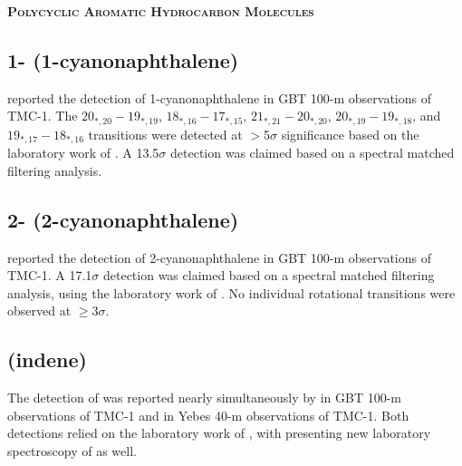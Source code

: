 \documentclass[twocolumn]{aastex631}
\newcommand{\update}[1]{{#1}}
\begin{document}
    
    \begin{center}
        \large
        \textsc{\textbf{\update{Polycyclic Aromatic Hydrocarbon Molecules}}}
        \label{pahs}
        \normalsize
    \end{center}	
		
	
	\subsection{\update{1- (1-cyanonaphthalene)}}
	\label{CNN1}
	
	\update{\citet{McGuire:2021aa} reported the detection of 1-cyanonaphthalene in GBT 100-m observations of TMC-1.  The $20_{*,20} - 19_{*,19}$,  $18_{*,16} - 17_{*,15}$, $21_{*,21} - 20_{*,20}$, $20_{*,19} - 19_{*,18}$, and $19_{*,17} - 18_{*,16}$ transitions were detected at $>$5$\sigma$ significance based on the laboratory work of \citet{McNaughton:2018op}.  A 13.5$\sigma$ detection was claimed based on a spectral matched filtering analysis.}	
	
	\subsection{\update{2- (2-cyanonaphthalene)}}
	\label{CNN2}
	
	\update{\citet{McGuire:2021aa} reported the detection of 2-cyanonaphthalene in GBT 100-m observations of TMC-1.  A 17.1$\sigma$ detection was claimed based on a spectral matched filtering analysis, using the laboratory work of \citet{McNaughton:2018op}.  No individual rotational transitions were observed at $\geq$3$\sigma$.}	
	
	\subsection{\update{ (indene)}}
	\label{C9H8}
	
	\update{The detection of  was reported nearly simultaneously by \citet{Burkhardt:2021ji} in GBT 100-m observations of TMC-1 and \citet{2021A&A...649L..15C} in Yebes 40-m observations of TMC-1.  Both detections relied on the laboratory work of \citet{Li:1979ng}, with \citet{Burkhardt:2021ji} presenting new laboratory spectroscopy of \ce{C9H8} as well.}	
	
    
\end{document}
